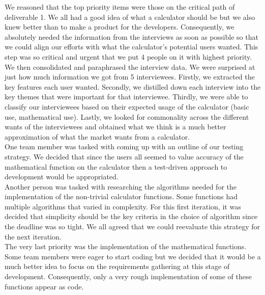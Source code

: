 \documentclass[a4paper]{article}
\begin{document}
We reasoned that the top priority items were those on the critical path of deliverable 1. We all had a good idea of what a calculator should be but we also knew better than to make a product for the developers. Consequently, we absolutely needed the information from the interviews as soon as possible so that we could align our efforts with what the calculator's potential users wanted. This step was so critical and urgent that we put 4 people on it with highest priority. \\

We then consolidated and paraphrased the interview data. We were surprised at just how much information we got from 5 interviewees. Firstly, we extracted the key features each user wanted. Secondly, we distilled down each interview into the key themes that were important for that interviewee. Thirdly, we were able to classify our interviewees based on their expected usage of the calculator (basic use, mathematical use). Lastly, we looked for commonality across the different wants of the interviewees and obtained what we think is a much better approximation of what the market wants from a calculator. \\

One team member was tasked with coming up with an outline of our testing strategy. We decided that since the users all seemed to value accuracy of the mathematical function on the calculator then a test-driven approach to development would be appropriated. \\

Another person was tasked with researching the algorithms needed for the implementation of the non-trivial calculator functions. Some functions had multiple algorithms that varied in complexity. For this first iteration, it was decided that simplicity should be the key criteria in the choice of algorithm since the deadline was so tight. We all agreed that we could reevaluate this strategy for the next iteration. \\

The very last priority was the implementation of the mathematical functions. Some team members were eager to start coding but we decided that it would be a much better idea to focus on the requirements gathering at this stage of development. Consequently, only a very rough implementation of some of these functions appear as code. \\
\end{document}
